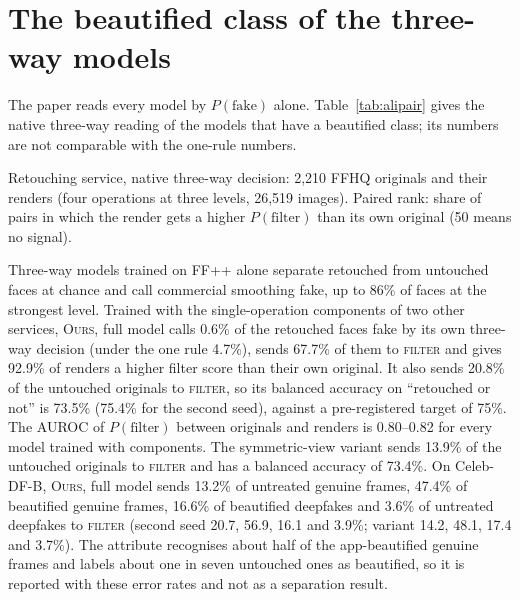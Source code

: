 \documentclass[10pt]{article}
\newcommand{\oursF}{\textsc{Ours}, full model}
\begin{document}
\section{The beautified class of the three-way models}
\label{sec:native}
The paper reads every model by $P(\text{fake})$ alone. Table~\ref{tab:alipair} gives the native three-way reading of the models that
have a beautified class; its numbers are not comparable with the one-rule numbers.
\begin{table}[H]
\centering
\caption{Retouching service, native three-way decision: 2,210 FFHQ originals and their renders (four operations at three levels,
26,519 images). Paired rank: share of pairs in which the render gets a higher $P(\text{filter})$ than its own original (50 means no
signal).}
\label{tab:alipair}
\footnotesize
\begin{adjustbox}{max width=\linewidth}\end{adjustbox}
\end{table}
Three-way models trained on FF++ alone separate retouched from untouched faces at chance and call commercial smoothing fake, up to 86\%
of faces at the strongest level. Trained with the single-operation components of two other services, \oursF{} calls 0.6\% of the
retouched faces fake by its own three-way decision (under the one rule 4.7\%), sends 67.7\% of them to \textsc{filter} and gives 92.9\%
of renders a higher filter score than their own original. It also sends 20.8\% of the untouched originals to \textsc{filter}, so its
balanced accuracy on ``retouched or not'' is 73.5\% (75.4\% for the second seed), against a pre-registered target of 75\%. The AUROC
of $P(\text{filter})$ between originals and renders is 0.80--0.82 for every model trained with components. The symmetric-view variant
sends 13.9\% of the untouched originals to \textsc{filter} and has a balanced accuracy of 73.4\%. On Celeb-DF-B, \oursF{} sends 13.2\%
of untreated genuine frames, 47.4\% of beautified genuine frames, 16.6\% of beautified deepfakes and 3.6\% of untreated deepfakes to
\textsc{filter} (second seed 20.7, 56.9, 16.1 and 3.9\%; variant 14.2, 48.1, 17.4 and 3.7\%). The attribute recognises about half of
the app-beautified genuine frames and labels about one in seven untouched ones as beautified, so it is reported with these error
rates and not as a separation result.
\end{document}
